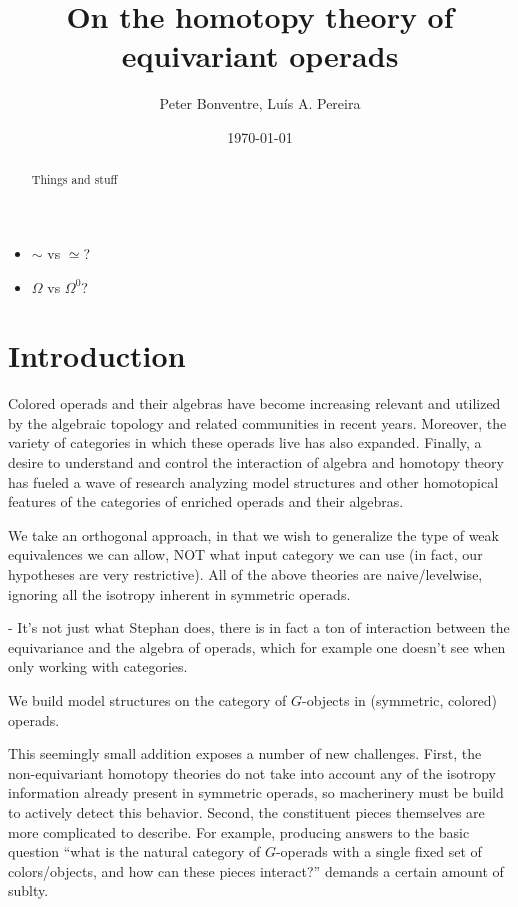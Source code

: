 \documentclass[a4paper,10pt
,draft
]{article}%
\title{On the homotopy theory of equivariant operads}
\author{Peter Bonventre, Lu\'is A. Pereira}%
\date{\today}
\numberwithin{equation}{section}
\numberwithin{figure}{section}
\theoremstyle{definition} %
\newcommand{\1}{\ensuremath{\mathbbm 1}}%
\begin{document}
\maketitle

\begin{abstract}
      Things and stuff
\end{abstract}

\begin{itemize}
\item $\sim$ vs $\simeq$?
\item $\Omega$ vs $\Omega^0$?
\end{itemize}

\tableofcontents







\section{Introduction}

Colored operads and their algebras have become increasing relevant and utilized by the algebraic topology and related communities in recent years.
Moreover, the variety of categories in which these operads live has also expanded.
Finally, a desire to understand and control the interaction of algebra and homotopy theory has fueled a wave of research analyzing
model structures and other homotopical features of the categories of enriched operads and their algebras.


We take an orthogonal approach, in that we wish to generalize the type of weak equivalences we can allow, NOT what input category we can use
(in fact, our hypotheses are very restrictive).
All of the above theories are naive/levelwise, ignoring all the isotropy inherent in symmetric operads.

- It's not just what Stephan does, there is in fact a ton of interaction between the equivariance and the algebra of operads, which for example one doesn't see when only working with categories.



We build model structures on the category of $G$-objects in (symmetric, colored) operads.






This seemingly small addition exposes a number of new challenges.
%
First, the non-equivariant homotopy theories do not take into account any of the isotropy information already present in symmetric operads,
so macherinery must be build to actively detect this behavior.
%
Second, the constituent pieces themselves are more complicated to describe.
For example, producing answers to the basic question
``what is the natural category of $G$-operads with a single fixed set of colors/objects, and how can these pieces interact?''
demands a certain amount of sublty.
\end{document}
